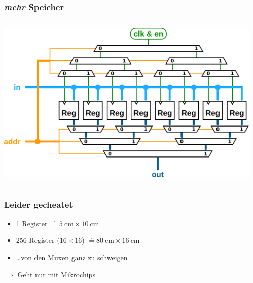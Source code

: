 \documentclass[t,aspectratio=169]{beamer}
\begin{document}
\begin{frame}
  \frametitle{\emph{mehr} Speicher}

  \begin{columns}
    \begin{column}{.7\textwidth}
      \includegraphics[width=\textwidth]{memory.pdf}
    \end{column}
    \begin{column}{.25\textwidth}
    \end{column}
  \end{columns}

\end{frame}

\begin{frame}
  \frametitle{Leider gecheatet}

  \begin{itemize}
  \item 1 Register ${} \mathrel{\hat=} \qty{5}{\centi\metre} \times \qty{10}{\centi\metre}$
  \item 256 Register ($16 \times 16$) ${} \mathrel{\hat=} \qty{80}{\centi\metre} \times \qty{16}{\centi\metre}$
  \item \ldots von den Muxen ganz zu schweigen
  \end{itemize}

  \bigskip

  $\Rightarrow$ Geht nur mit Mikrochips

\end{frame}
\end{document}
